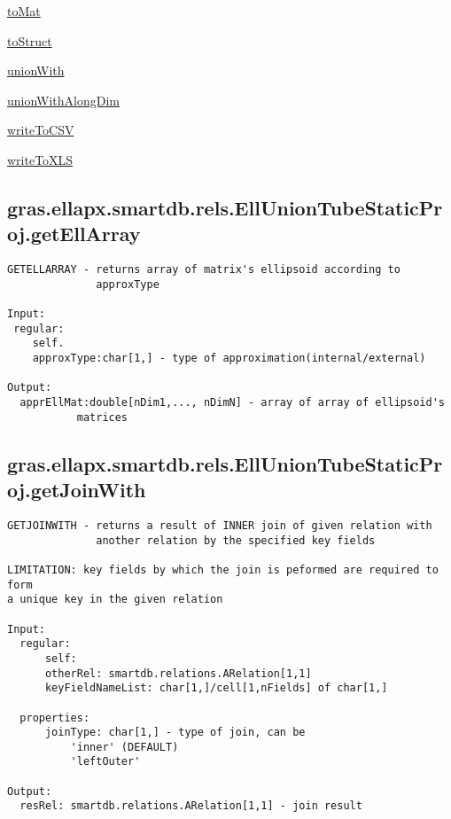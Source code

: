 \begin{list}{}{}
 \item \hyperref[method:smartdb.relations.ATypifiedStaticRelation.toMat]{toMat}
 \item \hyperref[method:smartdb.relations.ATypifiedStaticRelation.toStruct]{toStruct}
 \item \hyperref[method:smartdb.relations.ATypifiedStaticRelation.unionWith]{unionWith}
 \item \hyperref[method:smartdb.relations.ATypifiedStaticRelation.unionWithAlongDim]{unionWithAlongDim}
 \item \hyperref[method:smartdb.relations.ATypifiedStaticRelation.writeToCSV]{writeToCSV}
 \item \hyperref[method:smartdb.relations.ATypifiedStaticRelation.writeToXLS]{writeToXLS}
\end{list}
\subsection{\texorpdfstring{gras.ellapx.smartdb.rels.EllUnionTubeStaticProj.getEllArray}{getEllArray}}\label{method:gras.ellapx.smartdb.rels.EllUnionTubeStaticProj.getEllArray}
\begin{verbatim}
GETELLARRAY - returns array of matrix's ellipsoid according to
              approxType

Input:
 regular:
    self.
    approxType:char[1,] - type of approximation(internal/external)

Output:
  apprEllMat:double[nDim1,..., nDimN] - array of array of ellipsoid's
           matrices
\end{verbatim}
\subsection{\texorpdfstring{gras.ellapx.smartdb.rels.EllUnionTubeStaticProj.getJoinWith}{getJoinWith}}\label{method:gras.ellapx.smartdb.rels.EllUnionTubeStaticProj.getJoinWith}
\begin{verbatim}
GETJOINWITH - returns a result of INNER join of given relation with
              another relation by the specified key fields

LIMITATION: key fields by which the join is peformed are required to form
a unique key in the given relation

Input:
  regular:
      self:
      otherRel: smartdb.relations.ARelation[1,1]
      keyFieldNameList: char[1,]/cell[1,nFields] of char[1,]

  properties:
      joinType: char[1,] - type of join, can be
          'inner' (DEFAULT)
          'leftOuter'

Output:
  resRel: smartdb.relations.ARelation[1,1] - join result
\end{verbatim}
